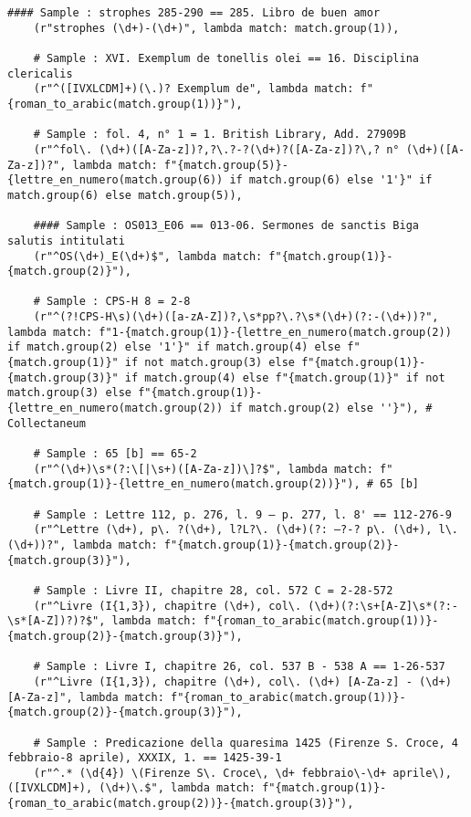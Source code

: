 \begin{lstlisting}[breaklines=true]
	#### Sample : strophes 285-290 == 285. Libro de buen amor 
	(r"strophes (\d+)-(\d+)", lambda match: match.group(1)),
	
	# Sample : XVI. Exemplum de tonellis olei == 16. Disciplina clericalis
	(r"^([IVXLCDM]+)(\.)? Exemplum de", lambda match: f"{roman_to_arabic(match.group(1))}"), 
	
	# Sample : fol. 4, n° 1 = 1. British Library, Add. 27909B
	(r"^fol\. (\d+)([A-Za-z])?,?\.?-?(\d+)?([A-Za-z])?\,? n° (\d+)([A-Za-z])?", lambda match: f"{match.group(5)}-{lettre_en_numero(match.group(6)) if match.group(6) else '1'}" if match.group(6) else match.group(5)),
	
	#### Sample : OS013_E06 == 013-06. Sermones de sanctis Biga salutis intitulati
	(r"^OS(\d+)_E(\d+)$", lambda match: f"{match.group(1)}-{match.group(2)}"), 
	
	# Sample : CPS-H 8 = 2-8
	(r"^(?!CPS-H\s)(\d+)([a-zA-Z])?,\s*pp?\.?\s*(\d+)(?:-(\d+))?", lambda match: f"1-{match.group(1)}-{lettre_en_numero(match.group(2)) if match.group(2) else '1'}" if match.group(4) else f"{match.group(1)}" if not match.group(3) else f"{match.group(1)}-{match.group(3)}" if match.group(4) else f"{match.group(1)}" if not match.group(3) else f"{match.group(1)}-{lettre_en_numero(match.group(2)) if match.group(2) else ''}"), # Collectaneum
	
	# Sample : 65 [b] == 65-2
	(r"^(\d+)\s*(?:\[|\s+)([A-Za-z])\]?$", lambda match: f"{match.group(1)}-{lettre_en_numero(match.group(2))}"), # 65 [b]
	
	# Sample : Lettre 112, p. 276, l. 9 – p. 277, l. 8' == 112-276-9
	(r"^Lettre (\d+), p\. ?(\d+), l?L?\. (\d+)(?: –?-? p\. (\d+), l\. (\d+))?", lambda match: f"{match.group(1)}-{match.group(2)}-{match.group(3)}"),
	
	# Sample : Livre II, chapitre 28, col. 572 C = 2-28-572
	(r"^Livre (I{1,3}), chapitre (\d+), col\. (\d+)(?:\s+[A-Z]\s*(?:-\s*[A-Z])?)?$", lambda match: f"{roman_to_arabic(match.group(1))}-{match.group(2)}-{match.group(3)}"),
	
	# Sample : Livre I, chapitre 26, col. 537 B - 538 A == 1-26-537
	(r"^Livre (I{1,3}), chapitre (\d+), col\. (\d+) [A-Za-z] - (\d+) [A-Za-z]", lambda match: f"{roman_to_arabic(match.group(1))}-{match.group(2)}-{match.group(3)}"),
	
	# Sample : Predicazione della quaresima 1425 (Firenze S. Croce, 4 febbraio-8 aprile), XXXIX, 1. == 1425-39-1
	(r"^.* (\d{4}) \(Firenze S\. Croce\, \d+ febbraio\-\d+ aprile\), ([IVXLCDM]+), (\d+)\.$", lambda match: f"{match.group(1)}-{roman_to_arabic(match.group(2))}-{match.group(3)}"),
	

\end{lstlisting}
